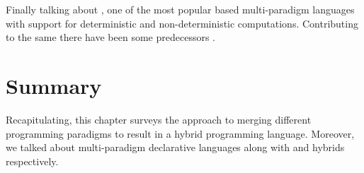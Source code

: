 \documentclass[thesis-solanki.tex]{subfiles}
\begin{document}
Finally talking about , one of the most popular  based multi-paradigm languages
with support for deterministic and non-deterministic computations. Contributing to the same there have been some
predecessors \cite{website:alf,website:toy}.        


\section{Summary}
Recapitulating, this chapter surveys the approach to merging different programming paradigms to result in a hybrid
programming language.
Moreover, we talked about multi-paradigm declarative languages along with  and 
hybrids respectively.


\ifMain\ifDraft
\begin{scope}
  \nolinenumbers
  \enotesize
  \par
  \begin{singlespace}
  \setlength{\parskip}{12pt plus 2pt minus 1pt}
  \theendnotes
  \par
  \end{singlespace}
\end{scope}
\fi\fi
\end{document}
